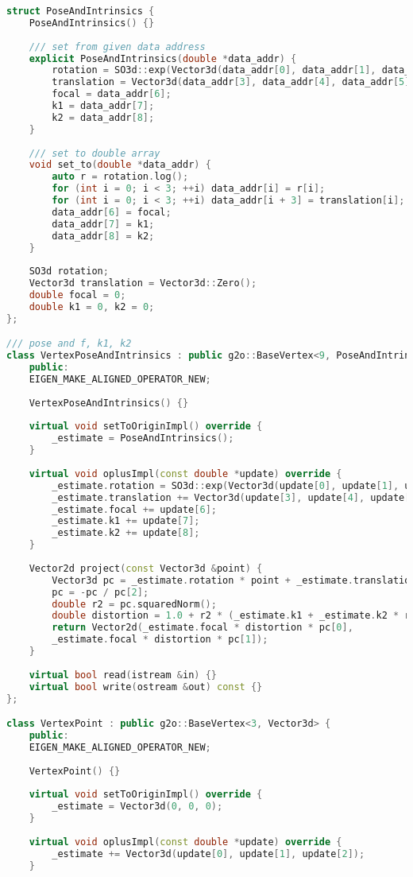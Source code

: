 \begin{lstlisting}[language=c++,caption=slambook2/ch9/bundle_adjustment_g2o.cpp (part)]
struct PoseAndIntrinsics {
	PoseAndIntrinsics() {}
	
	/// set from given data address
	explicit PoseAndIntrinsics(double *data_addr) {
		rotation = SO3d::exp(Vector3d(data_addr[0], data_addr[1], data_addr[2]));
		translation = Vector3d(data_addr[3], data_addr[4], data_addr[5]);
		focal = data_addr[6];
		k1 = data_addr[7];
		k2 = data_addr[8];
	}
	
	/// set to double array
	void set_to(double *data_addr) {
		auto r = rotation.log();
		for (int i = 0; i < 3; ++i) data_addr[i] = r[i];
		for (int i = 0; i < 3; ++i) data_addr[i + 3] = translation[i];
		data_addr[6] = focal;
		data_addr[7] = k1;
		data_addr[8] = k2;
	}
	
	SO3d rotation;
	Vector3d translation = Vector3d::Zero();
	double focal = 0;
	double k1 = 0, k2 = 0;
};

/// pose and f, k1, k2
class VertexPoseAndIntrinsics : public g2o::BaseVertex<9, PoseAndIntrinsics> {
	public:
	EIGEN_MAKE_ALIGNED_OPERATOR_NEW;
	
	VertexPoseAndIntrinsics() {}
	
	virtual void setToOriginImpl() override {
		_estimate = PoseAndIntrinsics();
	}
	
	virtual void oplusImpl(const double *update) override {
		_estimate.rotation = SO3d::exp(Vector3d(update[0], update[1], update[2])) * _estimate.rotation;
		_estimate.translation += Vector3d(update[3], update[4], update[5]);
		_estimate.focal += update[6];
		_estimate.k1 += update[7];
		_estimate.k2 += update[8];
	}
	
	Vector2d project(const Vector3d &point) {
		Vector3d pc = _estimate.rotation * point + _estimate.translation;
		pc = -pc / pc[2];
		double r2 = pc.squaredNorm();
		double distortion = 1.0 + r2 * (_estimate.k1 + _estimate.k2 * r2);
		return Vector2d(_estimate.focal * distortion * pc[0],
		_estimate.focal * distortion * pc[1]);
	}
	
	virtual bool read(istream &in) {}
	virtual bool write(ostream &out) const {}
};

class VertexPoint : public g2o::BaseVertex<3, Vector3d> {
	public:
	EIGEN_MAKE_ALIGNED_OPERATOR_NEW;
	
	VertexPoint() {}
	
	virtual void setToOriginImpl() override {
		_estimate = Vector3d(0, 0, 0);
	}
	
	virtual void oplusImpl(const double *update) override {
		_estimate += Vector3d(update[0], update[1], update[2]);
	}
	

\end{lstlisting}
